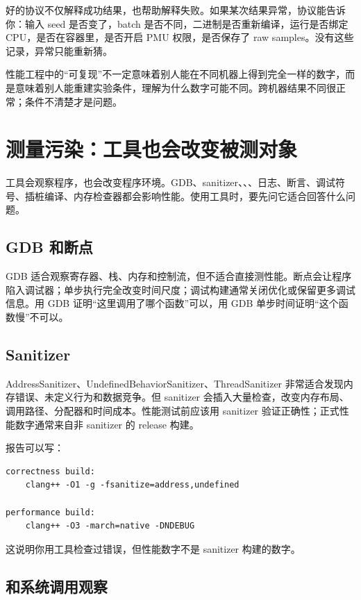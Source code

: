 好的协议不仅解释成功结果，也帮助解释失败。如果某次结果异常，协议能告诉你：输入 seed 是否变了，batch 是否不同，二进制是否重新编译，运行是否绑定 CPU，是否在容器里，是否开启 PMU 权限，是否保存了 raw samples。没有这些记录，异常只能重新猜。

性能工程中的“可复现”不一定意味着别人能在不同机器上得到完全一样的数字，而是意味着别人能重建实验条件，理解为什么数字可能不同。跨机器结果不同很正常；条件不清楚才是问题。

\section{测量污染：工具也会改变被测对象}

工具会观察程序，也会改变程序环境。GDB、sanitizer、、、日志、断言、调试符号、插桩编译、内存检查器都会影响性能。使用工具时，要先问它适合回答什么问题。

\subsection{GDB 和断点}

GDB 适合观察寄存器、栈、内存和控制流，但不适合直接测性能。断点会让程序陷入调试器；单步执行完全改变时间尺度；调试构建通常关闭优化或保留更多调试信息。用 GDB 证明“这里调用了哪个函数”可以，用 GDB 单步时间证明“这个函数慢”不可以。

\subsection{Sanitizer}

AddressSanitizer、UndefinedBehaviorSanitizer、ThreadSanitizer 非常适合发现内存错误、未定义行为和数据竞争。但 sanitizer 会插入大量检查，改变内存布局、调用路径、分配器和时间成本。性能测试前应该用 sanitizer 验证正确性；正式性能数字通常来自非 sanitizer 的 release 构建。

报告可以写：

\begin{lstlisting}
correctness build:
    clang++ -O1 -g -fsanitize=address,undefined

performance build:
    clang++ -O3 -march=native -DNDEBUG
\end{lstlisting}

这说明你用工具检查过错误，但性能数字不是 sanitizer 构建的数字。

\subsection{ 和系统调用观察}

